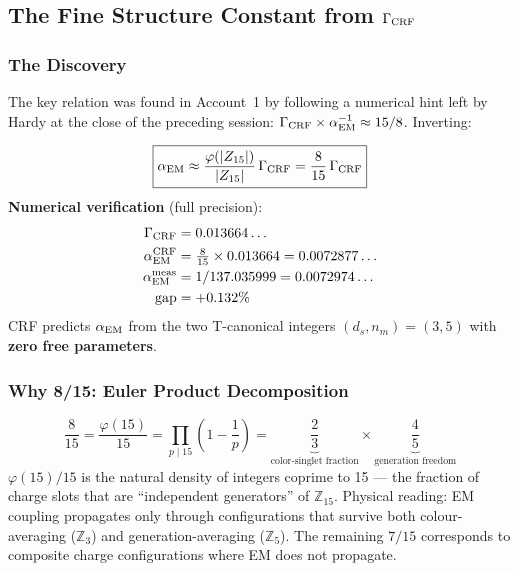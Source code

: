 \documentclass[12pt, a4paper]{article}
\begin{document}
\subsection{The Fine Structure Constant from $\Gamma_{\rm CRF}$}
\label{zc24:sec:alpha}

\subsubsection{The Discovery}

The key relation was found in Account~1 by following a
numerical hint left by Hardy at the close of the preceding
session: $\Gamma_{\rm CRF} \times \alpha_{\rm EM}^{-1} \approx 15/8$.
Inverting:

\begin{derivedbox}[title={FIND-ZC24-ALPHA-01: Fine Structure
  Constant from $\Gamma_{\rm CRF}$}]
\[
  \boxed{
    \alpha_{\rm EM}
    \approx \frac{\varphi(|Z_{15}|)}{|Z_{15}|}\,\Gamma_{\rm CRF}
    = \frac{8}{15}\,\Gamma_{\rm CRF}
  }
\]
\textbf{Numerical verification} (full precision):
\begin{align*}
  \Gamma_{\rm CRF} &= 0.013664\ldots \\
  \alpha_{\rm EM}^{\rm CRF}
    &= \tfrac{8}{15}\times 0.013664 = 0.0072877\ldots \\
  \alpha_{\rm EM}^{\rm meas}
    &= 1/137.035999 = 0.0072974\ldots \\
  \text{gap} &= +0.132\%
\end{align*}
CRF predicts $\alpha_{\rm EM}$ from the two T-canonical integers
$(d_s,n_m)=(3,5)$ with \textbf{zero free parameters}.
\end{derivedbox}

\subsubsection{Why 8/15: Euler Product Decomposition}

\begin{derivedbox}[title={FIND-ZC24-ALPHA-02: Euler Product
  Structure of the Coupling Filter}]
\[
  \frac{8}{15}
  = \frac{\varphi(15)}{15}
  = \prod_{p\mid 15}\!\left(1-\frac{1}{p}\right)
  = \underbrace{\frac{2}{3}}_{\text{color-singlet fraction}}
    \times
    \underbrace{\frac{4}{5}}_{\text{generation freedom}}
\]
$\varphi(15)/15$ is the natural density of integers coprime
to 15 --- the fraction of charge slots that are
``independent generators'' of $\mathbb{Z}_{15}$.
Physical reading: EM coupling propagates only through
configurations that survive both colour-averaging
($\mathbb{Z}_3$) and generation-averaging ($\mathbb{Z}_5$).
The remaining $7/15$ corresponds to composite charge
configurations where EM does not propagate.
\end{derivedbox}
\end{document}
